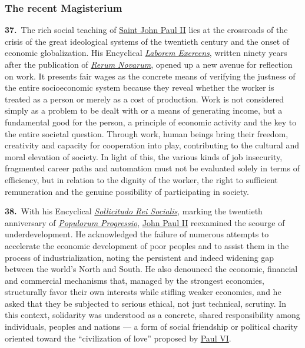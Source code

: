 \documentclass{article}
\begin{document}
\subsubsection{The recent Magisterium}

\textbf{37.}\ The rich social teaching of \href{https://www.vatican.va/content/john-paul-ii/en.html}{Saint John Paul II} lies at the crossroads of the crisis of the great ideological systems of the twentieth century and the onset of economic globalization. His Encyclical \href{https://www.vatican.va/content/john-paul-ii/en/encyclicals/documents/hf_jp-ii_enc_14091981_laborem-exercens.html}{\emph{Laborem Exercens}}, written ninety years after the publication of \href{https://www.vatican.va/content/leo-xiii/en/encyclicals/documents/hf_l-xiii_enc_15051891_rerum-novarum.html}{\emph{Rerum Novarum}}, opened up a new avenue for reflection on work. It presents fair wages as the concrete means of verifying the justness of the entire socioeconomic system because they reveal whether the worker is treated as a person or merely as a cost of production.\cite{n35} Work is not considered simply as a problem to be dealt with or a means of generating income, but a fundamental good for the person, a principle of economic activity and the key to the entire societal question. Through work, human beings bring their freedom, creativity and capacity for cooperation into play, contributing to the cultural and moral elevation of society.\cite{n36} In light of this, the various kinds of job insecurity, fragmented career paths and automation must not be evaluated solely in terms of efficiency, but in relation to the dignity of the worker, the right to sufficient remuneration and the genuine possibility of participating in society.

\textbf{38.}\ With his Encyclical \href{https://www.vatican.va/content/john-paul-ii/en/encyclicals/documents/hf_jp-ii_enc_30121987_sollicitudo-rei-socialis.html}{\emph{Sollicitudo Rei Socialis}}, marking the twentieth anniversary of \href{https://www.vatican.va/content/paul-vi/en/encyclicals/documents/hf_p-vi_enc_26031967_populorum.html}{\emph{Populorum Progressio}}, \href{https://www.vatican.va/content/john-paul-ii/en.html}{John Paul II} reexamined the scourge of underdevelopment. He acknowledged the failure of numerous attempts to accelerate the economic development of poor peoples and to assist them in the process of industrialization, noting the persistent and indeed widening gap between the world's North and South.\cite{n37} He also denounced the economic, financial and commercial mechanisms that, managed by the strongest economies, structurally favor their own interests while stifling weaker economies, and he asked that they be subjected to serious ethical, not just technical, scrutiny.\cite{n38} In this context, solidarity was understood as a concrete, shared responsibility among individuals, peoples and nations --- a form of social friendship or political charity oriented toward the ``civilization of love'' proposed by \href{https://www.vatican.va/content/paul-vi/en.html}{Paul VI}.\cite{n39}
\end{document}
